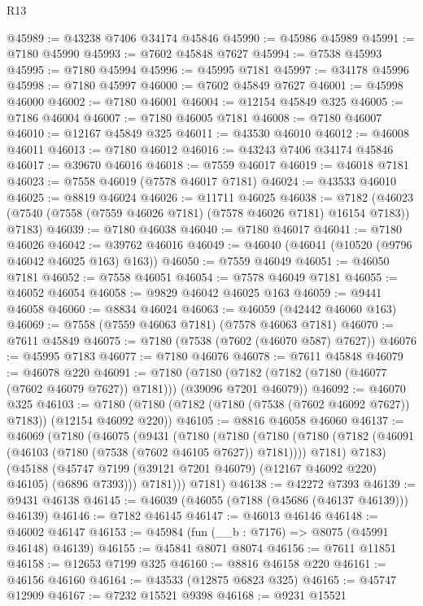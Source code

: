 \begin{lexlean}{R13}
\begin{coremodule}
@45989 := @43238 @7406 @34174 @45846
@45990 := @45986 @45989
@45991 := @7180 @45990
@45993 := @7602 @45848 @7627
@45994 := @7538 @45993
@45995 := @7180 @45994
@45996 := @45995 @7181
@45997 := @34178 @45996
@45998 := @7180 @45997
@46000 := @7602 @45849 @7627
@46001 := @45998 @46000
@46002 := @7180 @46001
@46004 := @12154 @45849 @325
@46005 := @7186 @46004
@46007 := @7180 @46005 @7181
@46008 := @7180 @46007
@46010 := @12167 @45849 @325
@46011 := @43530 @46010
@46012 := @46008 @46011
@46013 := @7180 @46012
@46016 := @43243 @7406 @34174 @45846
@46017 := @39670 @46016
@46018 := @7559 @46017
@46019 := @46018 @7181
@46023 := @7558 @46019 (@7578 @46017 @7181)
@46024 := @43533 @46010
@46025 := @8819 @46024
@46026 := @11711 @46025
@46038 := @7182
    (@46023 (@7540 (@7558 (@7559 @46026 @7181) (@7578 @46026 @7181) @16154 @7183)) @7183)
@46039 := @7180 @46038
@46040 := @7180 @46017
@46041 := @7180 @46026
@46042 := @39762 @46016
@46049 := @46040 (@46041 (@10520 (@9796 @46042 @46025 @163) @163))
@46050 := @7559 @46049
@46051 := @46050 @7181
@46052 := @7558 @46051
@46054 := @7578 @46049 @7181
@46055 := @46052 @46054
@46058 := @9829 @46042 @46025 @163
@46059 := @9441 @46058
@46060 := @8834 @46024
@46063 := @46059 (@42442 @46060 @163)
@46069 := @7558 (@7559 @46063 @7181) (@7578 @46063 @7181)
@46070 := @7611 @45849
@46075 := @7180 (@7538 (@7602 (@46070 @587) @7627))
@46076 := @45995 @7183
@46077 := @7180 @46076
@46078 := @7611 @45848
@46079 := @46078 @220
@46091 := @7180
    (@7180 (@7182 (@7182 (@7180 (@46077 (@7602 @46079 @7627)) @7181))) (@39096 @7201 @46079))
@46092 := @46070 @325
@46103 := @7180 (@7180 (@7182 (@7180 (@7538 (@7602 @46092 @7627)) @7183)) (@12154 @46092 @220))
@46105 := @8816 @46058 @46060
@46137 := @46069
    (@7180
      (@46075
        (@9431
          (@7180
            (@7180
              (@7180
                (@7180 (@7182 (@46091 (@46103 (@7180 (@7538 (@7602 @46105 @7627)) @7181)))) @7181)
                @7183)
              (@45188
                (@45747 @7199 (@39121 @7201 @46079) (@12167 @46092 @220) @46105)
                (@6896 @7393)))
            @7181)))
      @7181)
@46138 := @42272 @7393
@46139 := @9431 @46138
@46145 := @46039 (@46055 (@7188 (@45686 (@46137 @46139))) @46139)
@46146 := @7182 @46145
@46147 := @46013 @46146
@46148 := @46002 @46147
@46153 := @45984 (fun (__b : @7176) => @8075 (@45991 @46148) @46139)
@46155 := @45841 @8071 @8074
@46156 := @7611 @11851
@46158 := @12653 @7199 @325
@46160 := @8816 @46158 @220
@46161 := @46156 @46160
@46164 := @43533 (@12875 @6823 @325)
@46165 := @45747 @12909
@46167 := @7232 @15521 @9398
@46168 := @9231 @15521

\end{coremodule}
\end{lexlean}
